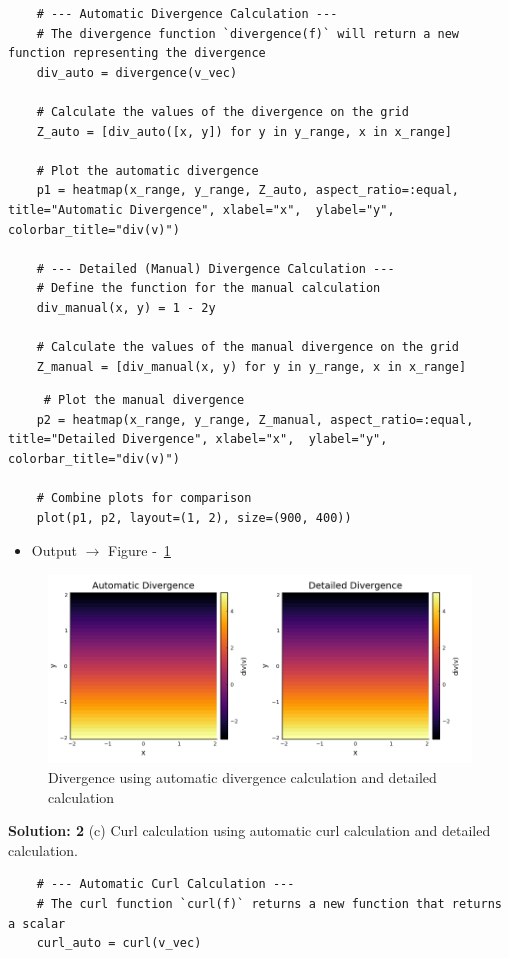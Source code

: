 \documentclass{homework}
\begin{document}
\begin{solution}
\begin{verbatim}
    # --- Automatic Divergence Calculation ---
    # The divergence function `divergence(f)` will return a new function representing the divergence
    div_auto = divergence(v_vec)

    # Calculate the values of the divergence on the grid
    Z_auto = [div_auto([x, y]) for y in y_range, x in x_range]

    # Plot the automatic divergence
    p1 = heatmap(x_range, y_range, Z_auto, aspect_ratio=:equal, title="Automatic Divergence", xlabel="x",  ylabel="y", colorbar_title="div(v)")
    
    # --- Detailed (Manual) Divergence Calculation ---
    # Define the function for the manual calculation
    div_manual(x, y) = 1 - 2y

    # Calculate the values of the manual divergence on the grid
    Z_manual = [div_manual(x, y) for y in y_range, x in x_range]   
    \end{verbatim}
    \begin{verbatim}   
     # Plot the manual divergence
    p2 = heatmap(x_range, y_range, Z_manual, aspect_ratio=:equal, title="Detailed Divergence", xlabel="x",  ylabel="y", colorbar_title="div(v)")
    
    # Combine plots for comparison
    plot(p1, p2, layout=(1, 2), size=(900, 400))
    \end{verbatim}
    
    \begin{itemize}
        \item Output $\rightarrow$ Figure -~\ref{fig:divercalvsauto}
    \end{itemize}
    
    \begin{figure}[H]
        \centering
        \includegraphics[width=0.5\linewidth]{media/divercalvsauto.png}
        \caption{Divergence using automatic divergence calculation and detailed calculation}
        \label{fig:divercalvsauto}
    \end{figure}
    
    \textbf{Solution: 2}
    (c)  Curl calculation using  automatic curl calculation and detailed calculation.
    \begin{verbatim}  
    # --- Automatic Curl Calculation ---
    # The curl function `curl(f)` returns a new function that returns a scalar
    curl_auto = curl(v_vec)


\end{verbatim}
\end{solution}
\end{document}
